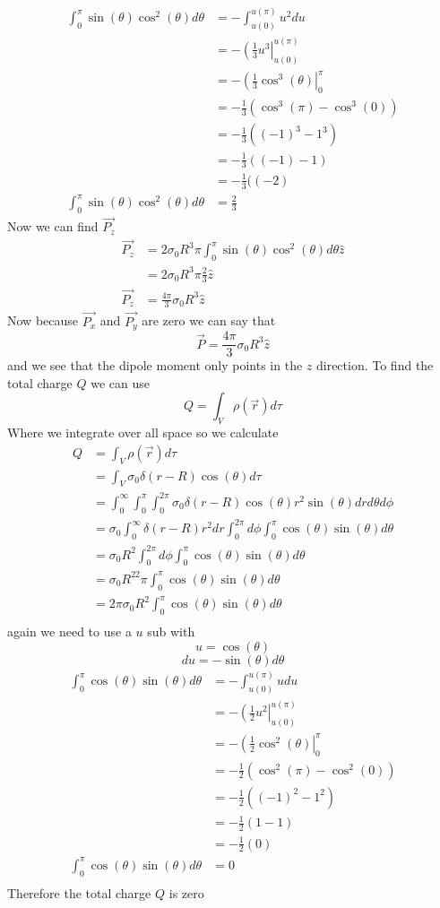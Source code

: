 \documentclass[11pt]{article}
\numberwithin{equation}{section}
\begin{document}
\begin{enumerate}[(i)]
\begin{align*}
\int_0^{\pi}\sin(\theta)\cos^2(\theta)d\theta &= -\int_{u(0)}^{u(\pi)}u^2du\\
&= -\left(\frac{1}{3}u^3\right|_{u(0)}^{u(\pi)}\\
&= -\left(\frac{1}{3}\cos^3(\theta)\right|_{0}^{\pi}\\
&= -\frac{1}{3}(\cos^3(\pi)-\cos^3(0))\\
&= -\frac{1}{3}((-1)^3-1^3)\\
&= -\frac{1}{3}((-1)-1)\\
&= -\frac{1}{3}((-2)\\
\int_0^{\pi}\sin(\theta)\cos^2(\theta)d\theta &= \frac{2}{3}
\end{align*}
Now we can find $\vec{P_z}$
\begin{align*}
\vec{P_z}  &= 2\sigma_0R^3\pi \int_0^{\pi}\sin(\theta)\cos^2(\theta)d\theta\hat{z}\\
&= 2\sigma_0R^3\pi \frac{2}{3}\hat{z}\\
\vec{P_z}&= \frac{4\pi}{3}\sigma_0R^3\hat{z}
\end{align*}
Now because $\vec{P_x}$ and $\vec{P_y}$ are zero we can say that
$$\vec{P} = \frac{4\pi}{3}\sigma_0R^3\hat{z}$$
and we see that the dipole moment only points in the $z$ direction. To find the total charge $Q$ we can use
$$Q = \int_V\rho(\vec{r})d\tau$$
Where we integrate over all space so we calculate
\begin{align*}
Q &= \int_V\rho(\vec{r})d\tau\\
 &= \int_V\sigma_0\delta(r-R)\cos(\theta)d\tau\\
 &= \int_0^{\infty}\int_0^{\pi}\int_0^{2\pi}\sigma_0\delta(r-R)\cos(\theta)r^2\sin(\theta)drd\theta d\phi\\
 &= \sigma_0\int_0^{\infty}\delta(r-R)r^2dr\int_0^{2\pi}d\phi\int_0^{\pi}\cos(\theta)\sin(\theta)d\theta\\
 &= \sigma_0R^2\int_0^{2\pi}d\phi\int_0^{\pi}\cos(\theta)\sin(\theta)d\theta\\
 &= \sigma_0R^22\pi\int_0^{\pi}\cos(\theta)\sin(\theta)d\theta\\
 &= 2\pi\sigma_0R^2\int_0^{\pi}\cos(\theta)\sin(\theta)d\theta\\
\end{align*}
again we need to use a $u$ sub with 
$$u=\cos(\theta)$$
$$du=-\sin(\theta)d\theta$$
\begin{align*}
\int_0^{\pi}\cos(\theta)\sin(\theta)d\theta &= -\int_{u(0)}^{u(\pi)}udu \\
&= -\left(\frac{1}{2}u^2\right|_{u(0)}^{u(\pi)}\\
&= -\left(\frac{1}{2}\cos^2(\theta)\right|_{0}^{\pi}\\
&= -\frac{1}{2}\left(\cos^2(\pi)-\cos^2(0)\right)\\
&= -\frac{1}{2}\left((-1)^2-1^2\right)\\
&= -\frac{1}{2}\left(1-1\right)\\
&= -\frac{1}{2}\left(0\right)\\
\int_0^{\pi}\cos(\theta)\sin(\theta)d\theta &= 0\\
\end{align*}
Therefore the total charge $Q$ is zero


\end{enumerate}
\end{document}

